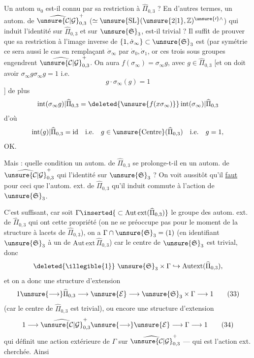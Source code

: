 Un  autom $u_0$ est-il connu par sa restriction à $\widehat\Pi_{0,3}$ ? En d'autres termes, un autom. de $\widehat{\unsure{\mathcal C|\mathcal G}}_{0,3}^{+}$  ($\simeq\unsure{\mathrm{SL}}(\unsure{2|1},\mathbb Z)^{\unsure{\prime}\wedge}$) qui induit l'identité sur $\widehat\Pi_{0,3}$ et sur $\unsure{\mathfrak S}_{3}$, est-il trivial ? Il suffit de prouver que sa restriction à l'image inverse  de $\{1,\dot\sigma_\infty\}\subset\unsure{\mathfrak S}_{3}$ est  (par symétrie ce sera aussi le cas en remplaçant $\dot\sigma_\infty$ par $\dot\sigma_0,\dot\sigma_1$, or ces trois sous groupes engendrent $\widehat{\unsure{\mathcal C|\mathcal G}}_{0,3}^{+}$. On aura $f(\sigma_\infty)=\sigma_\infty g$, avec $g\in\widehat\Pi_{0,3}$ [et on doit avoir $\sigma_\infty g\sigma_\infty g=1$ i.e.
\[
g\cdot\sigma_\infty(g)=1
\]
]
de plus  
\[
\operatorname{int}(\sigma_\infty g)\vert\widehat\Pi_{0,3}
=\deleted{\unsure{f(x\sigma_\infty)}}\operatorname{int}(\sigma_\infty)\vert\widehat\Pi_{0,3}
\]
d'où 
\[
\operatorname{int}(g)\vert\widehat\Pi_{0,3}=\mathrm{id}
\quad\text{i.e.}\quad
g\in\unsure{\operatorname{Centre}}(\widehat\Pi_{0,3})
\quad\text{i.e.}\quad g=1,
\]
OK.

Mais : quelle condition un autom. de $\widehat\Pi_{0,3}$  se prolonge-t-il en un autom. de $\widehat{\unsure{\mathcal C|\mathcal G}}_{0,3}^{+}$ qui  l'identité sur $\unsure{\mathfrak S}_{3}$ ? On voit aussitôt qu'il \uline{faut} pour ceci que l'autom. ext. de $\widehat\Pi_{0,3}$ qu'il induit commute à l'action de $\unsure{\mathfrak S}_{3}$.


C'est suffisant, car soit $\Gamma\inserted{{}\subset\mathrm{Aut\,ext}(\widehat{\Pi}_{0,3})}$ le groupe des autom.
ext. de $\widehat{\Pi}_{0,3}$ qui ont cette propriété (on ne
se préoccupe pas pour le moment de la
structure à lacets de $\widehat{\Pi}_{0,3}$), on a
$\Gamma\cap\unsure{\mathfrak S}_3=(1)$ (en identifiant $\unsure{\mathfrak S}_3$ à un
 de $\mathrm{Aut\,ext}\,\widehat{\Pi}_{0,3}$) car  le centre
de $\unsure{\mathfrak S}_3$ est trivial, donc
\[
\deleted{\illegible{1}}\ \unsure{\mathfrak S}_3\times\Gamma\hookrightarrow\mathrm{Autext}(\widehat{\Pi}_{0,3}),
\]
et on a donc une structure d'extension
\[
1\unsure{\longrightarrow}\widehat{\Pi}_{0,3}\longrightarrow\unsure{\mathcal E}\longrightarrow\unsure{\mathfrak S}_3\times\Gamma\longrightarrow1
\tag{33}
\]
(car le centre de $\widehat{\Pi}_{0,3}$ est trivial), ou encore
une structure d'extension
\[
1\longrightarrow\widehat{\unsure{\mathcal C|\mathcal G}}_{0,3}^{+}\unsure{\longrightarrow}\unsure{\mathcal E}\longrightarrow\Gamma\longrightarrow1
\tag{34}
\]
qui définit une action extérieure de $\Gamma$
sur $\widehat{\unsure{\mathcal C|\mathcal G}}_{0,3}^{+}$ --- qui est l'action ext.
cherchée. Ainsi

